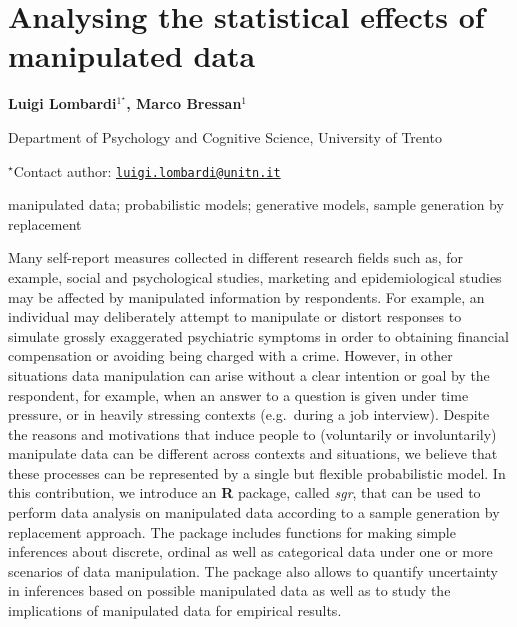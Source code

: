 \documentclass[\main/boa.tex]{subfiles}
\begin{document}
\section{Analysing the statistical effects of manipulated data}

\begin{center}
  {\bf Luigi Lombardi$^{1^\star}$, Marco Bressan$^{1}$}
\end{center}

\vskip 0.3cm

\begin{affiliations}
\begin{enumerate}
\begin{minipage}{0.915\textwidth}
\centering
\item Department of Psychology and Cognitive Science, University of Trento \\[-2pt]
\end{minipage}
\end{enumerate}
$^\star$Contact author: \href{mailto:luigi.lombardi@unitn.it}{\nolinkurl{luigi.lombardi@unitn.it}}\\
\end{affiliations}

\vskip 0.5cm

\begin{minipage}{0.915\textwidth}
\keywords manipulated data; probabilistic models; generative models, sample
generation by replacement
\end{minipage}

\vskip 0.8cm

Many self-report measures collected in different research fields such
as, for example, social and psychological studies, marketing and
epidemiological studies may be affected by manipulated information by
respondents. For example, an individual may deliberately attempt to
manipulate or distort responses to simulate grossly exaggerated
psychiatric symptoms in order to obtaining financial compensation or
avoiding being charged with a crime. However, in other situations data
manipulation can arise without a clear intention or goal by the
respondent, for example, when an answer to a question is given under
time pressure, or in heavily stressing contexts (e.g.~during a job
interview). Despite the reasons and motivations that induce people to
(voluntarily or involuntarily) manipulate data can be different across
contexts and situations, we believe that these processes can be
represented by a single but flexible probabilistic model. In this
contribution, we introduce an \textbf{R} package, called \emph{sgr},
that can be used to perform data analysis on manipulated data according
to a sample generation by replacement approach. The package includes
functions for making simple inferences about discrete, ordinal as well
as categorical data under one or more scenarios of data manipulation.
The package also allows to quantify uncertainty in inferences based on
possible manipulated data as well as to study the implications of
manipulated data for empirical results.
\end{document}
